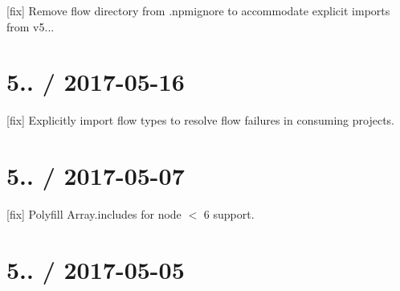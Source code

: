 
\begin{DoxyItemize}
\item \mbox{[}fix\mbox{]} Remove {\ttfamily flow} directory from {\ttfamily .npmignore} to accommodate explicit imports from {\ttfamily v5..}.
\end{DoxyItemize}

\section*{5.. / 2017-\/05-\/16 }


\begin{DoxyItemize}
\item \mbox{[}fix\mbox{]} Explicitly import flow types to resolve flow failures in consuming projects.
\end{DoxyItemize}

\section*{5.. / 2017-\/05-\/07 }


\begin{DoxyItemize}
\item \mbox{[}fix\mbox{]} Polyfill Array.\+includes for node $<$ 6 support.
\end{DoxyItemize}

\section*{5.. / 2017-\/05-\/05 }


